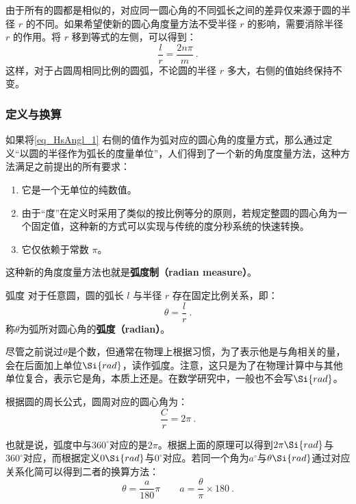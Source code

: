 由于所有的圆都是相似的，对应同一圆心角的不同弧长之间的差异仅来源于圆的半径 $r$ 的不同。如果希望使新的圆心角度量方法不受半径 $r$ 的影响，需要消除半径 $r$ 的作用。将 $r$ 移到等式的左侧，可以得到：
\begin{equation}\label{eq_HsAngl_1}
\frac{l}{r}=\frac{2n\pi}{m}~.
\end{equation}
这样，对于占圆周相同比例的圆弧，不论圆的半径 $r$ 多大，右侧的值始终保持不变。

\subsubsection{定义与换算}

如果将\autoref{eq_HsAngl_1} 右侧的值作为弧对应的圆心角的度量方式，那么通过定义“以圆的半径作为弧长的度量单位”，人们得到了一个新的角度度量方法，这种方法满足之前提出的所有要求：
\begin{enumerate}
\item 它是一个无单位的纯数值。
\item 由于“度”在定义时采用了类似的按比例等分的原则，若规定整圆的圆心角为一个固定值，这种新的方式可以实现与传统的度分秒系统的快速转换。
\item 它仅依赖于常数 $\pi$。
\end{enumerate}
这种新的角度度量方法也就是\textbf{弧度制（radian measure）}。

\begin{definition}{弧度}
对于任意圆，圆的弧长 $l$ 与半径 $r$ 存在固定比例关系，即：
\begin{equation}
\theta  = \frac{l}{r}~.
\end{equation}
称$\theta$为弧所对圆心角的\textbf{弧度（radian）}。
\end{definition}

尽管之前说过$\theta$是个数，但通常在物理上根据习惯，为了表示他是与角相关的量，会在后面加上单位$\Si{rad}$，读作弧度。注意，这只是为了在物理计算中与其他单位复合，表示它是角，本质上还是。在数学研究中，一般也不会写$\Si{rad}$。

根据圆的周长公式，圆周对应的圆心角为：
\begin{equation}
\frac{C}{r}=2\pi~.
\end{equation}



也就是说，弧度中与$360^\circ$对应的是$2\pi$。根据上面的原理可以得到$2\pi\Si{rad}$与$360^\circ$对应，而根据定义$0\Si{rad}$与$0^\circ$对应。若同一个角为$a^\circ$与$\theta\Si{rad}$通过对应关系化简可以得到二者的换算方法：
\begin{equation}
\theta=\frac{a}{180}\pi\qquad a=\frac{\theta}{\pi}\times180~.
\end{equation}

